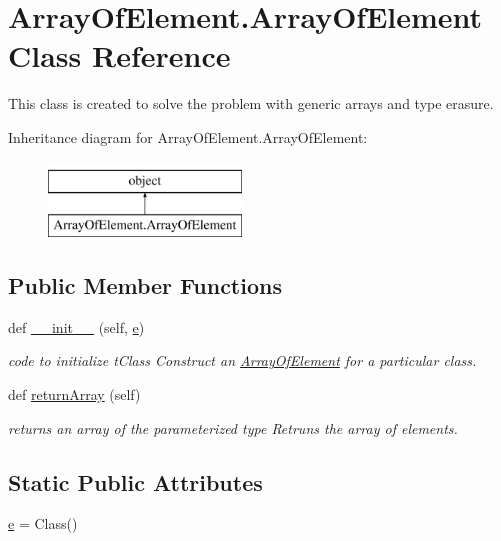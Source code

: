 \hypertarget{class_array_of_element_1_1_array_of_element}{}\section{Array\+Of\+Element.\+Array\+Of\+Element Class Reference}
\label{class_array_of_element_1_1_array_of_element}


This class is created to solve the problem with generic arrays and type erasure.  


Inheritance diagram for Array\+Of\+Element.\+Array\+Of\+Element\+:\begin{figure}[H]
\begin{center}
\leavevmode
\includegraphics[height=2.000000cm]{class_array_of_element_1_1_array_of_element}
\end{center}
\end{figure}
\subsection*{Public Member Functions}
\begin{DoxyCompactItemize}
\item 
def \hyperlink{class_array_of_element_1_1_array_of_element_a86dd11f48e2c074b58b89c6ecfab738a}{\+\_\+\+\_\+init\+\_\+\+\_\+} (self, \hyperlink{class_array_of_element_1_1_array_of_element_aabd7ed80731e426b27ef1997422a56f5}{e})
\begin{DoxyCompactList}\small\item\em code to initialize t\+Class Construct an \hyperlink{class_array_of_element_1_1_array_of_element}{Array\+Of\+Element} for a particular class. \end{DoxyCompactList}\item 
def \hyperlink{class_array_of_element_1_1_array_of_element_a739aa09f3989612b3508ce85995aee7b}{return\+Array} (self)
\begin{DoxyCompactList}\small\item\em returns an array of the parameterized type Retruns the array of elements. \end{DoxyCompactList}\end{DoxyCompactItemize}
\subsection*{Static Public Attributes}
\begin{DoxyCompactItemize}
\item 
\hyperlink{class_array_of_element_1_1_array_of_element_aabd7ed80731e426b27ef1997422a56f5}{e} = Class()
\end{DoxyCompactItemize}


